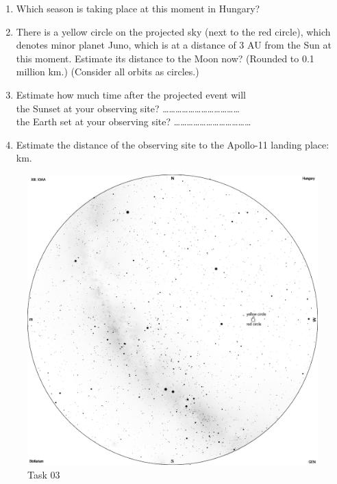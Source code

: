 \documentclass[a4paper,12pt]{extarticle}
\begin{document}
\begin{enumerate}
    \item Which season is taking place at this moment in Hungary?
    \item There is a yellow circle on the projected sky (next to the red circle), which denotes minor planet Juno, which is at a distance of 3 AU from the Sun at this moment. Estimate its distance to the Moon now? (Rounded to 0.1 million km.) (Consider all orbits as circles.)
    \item Estimate how much time after the projected event will\\
the Sunset at your observing site? ………………………………\\
the Earth set at your observing site? ………………………………
\item Estimate the distance of the observing site to the Apollo-11 landing place: \quad \quad km.
\end{enumerate}
\begin{figure}[H]
    \centering
    \includegraphics[width=0.95\linewidth]{19_O3.png}
    \caption{Task 03}
\end{figure}
\end{document}
